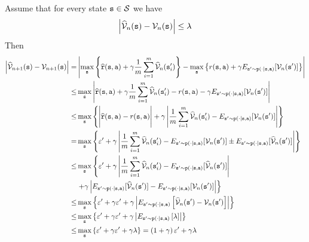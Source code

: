 Assume that for every state ${\tt s}\in\mathcal{S}$ we have 
\[
\left|\widehat{\mathcal{V}}_{n}({\tt s})-\mathcal{V}_{n}({\tt s})\right|\leq\lambda
\]
Then 
\begin{align*}
	\left|\widehat{\mathcal{V}}_{n+1}({\tt s})-\mathcal{V}_{n+1}({\tt s})\right|= & \left|\max_{{\tt s}}\left\{ \widehat{{\tt r}}({\tt s},{\tt a})+\gamma\frac{1}{m}\sum_{i=1}^{m}\widehat{\mathcal{V}}_{n}({\tt s}'_{i})\right\} -\max_{{\tt s}}\left\{ r({\tt s},{\tt a})+\gamma E_{{\tt s}'\sim {\tt p}\left(\cdot|{\tt s},{\tt a}\right)}[\mathcal{V}_{n}({\tt s}')]\right\} \right|\\
	\leq & \max_{{\tt s}}\left|\widehat{{\tt r}}({\tt s},{\tt a})+\gamma\frac{1}{m}\sum_{i=1}^{m}\widehat{\mathcal{V}}_{n}({\tt s}'_{i})-r({\tt s},{\tt a})-\gamma E_{{\tt s}'\sim {\tt p}\left(\cdot|{\tt s},{\tt a}\right)}[\mathcal{V}_{n}({\tt s}')]\right|\\
	\leq & \max_{{\tt s}}\left\{ \Bigg|\widehat{{\tt r}}({\tt s},{\tt a})-r({\tt s},{\tt a})\Bigg|+\gamma\left|\frac{1}{m}\sum_{i=1}^{m}\widehat{\mathcal{V}}_{n}({\tt s}'_{i})-E_{{\tt s}'\sim {\tt p}\left(\cdot|{\tt s},{\tt a}\right)}[\mathcal{V}_{n}({\tt s}')]\right|\right\} \\
	= & \max_{{\tt s}}\left\{ \varepsilon'+\gamma\left|\frac{1}{m}\sum_{i=1}^{m}\widehat{\mathcal{V}}_{n}({\tt s}'_{i})-E_{{\tt s}'\sim {\tt p}\left(\cdot|{\tt s},{\tt a}\right)}[\mathcal{V}_{n}({\tt s}')]\pm E_{{\tt s}'\sim {\tt p}\left(\cdot|{\tt s},{\tt a}\right)}[\widehat{\mathcal{V}}_{n}({\tt s}')]\right|\right\} \\
	\leq & \max_{{\tt s}}\left\{ \varepsilon'+\gamma\left|\frac{1}{m}\sum_{i=1}^{m}\widehat{\mathcal{V}}_{n}({\tt s}'_{i})-E_{{\tt s}'\sim {\tt p}\left(\cdot|{\tt s},{\tt a}\right)}[\widehat{\mathcal{V}}_{n}({\tt s}')]\right|\right.\\
	& \left.+\gamma\left|E_{{\tt s}'\sim {\tt p}\left(\cdot|{\tt s},{\tt a}\right)}[\widehat{\mathcal{V}}_{n}({\tt s}')]-E_{{\tt s}'\sim {\tt p}\left(\cdot|{\tt s},{\tt a}\right)}[\mathcal{V}_{n}({\tt s}')]\right|\right\} \\
	\leq & \max_{{\tt s}}\left\{ \varepsilon'+\gamma\varepsilon'+\gamma\left|E_{{\tt s}'\sim {\tt p}\left(\cdot|{\tt s},{\tt a}\right)}\left[\widehat{\mathcal{V}}_{n}({\tt s}')-\mathcal{V}_{n}({\tt s}')\right]\right|\right\} \\
	\leq & \max_{{\tt s}}\left\{ \varepsilon'+\gamma\varepsilon'+\gamma\left|E_{{\tt s}'\sim {\tt p}\left(\cdot|{\tt s},{\tt a}\right)}\left[\lambda\right]\right|\right\} \\
	\leq & \max_{{\tt s}}\left\{ \varepsilon'+\gamma\varepsilon'+\gamma\lambda\right\} =\left(1+\gamma\right)\varepsilon'+\gamma\lambda
\end{align*}

